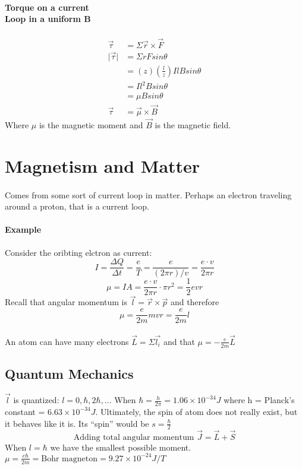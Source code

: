 \documentclass{article}
\begin{document}
    \paragraph{Torque on a current\\Loop in a uniform B}

    \begin{align*}
        \vec{\tau} &= \Sigma\vec{r}\times\vec{F}\\
        \lvert \vec{\tau}\rvert &= \Sigma rFsin\theta\\
        &= (z)(\frac{l}{z})I l B sin \theta \\
        &= I l^2Bsin\theta \\
        &= \mu B sin\theta \\
        \vec{\tau} &= \vec{\mu} \times \vec{B}
    \end{align*}
    Where $\mu$ is the magnetic moment and $\vec{B}$ is the magnetic field.
    \section{Magnetism and Matter}
    \paragraph{} Comes from some sort of current loop in matter. Perhaps an electron traveling around a proton, that is a current loop. 
    \paragraph{Example} Consider the oribting elctron as current:
    $$I = \frac{\Delta Q}{\Delta t} = \frac{e}{T} = \frac{e}{(2\pi r) / v} = \frac{e\cdot v}{2\pi r}$$
    $$\mu = IA = \frac{e\cdot v}{2\pi r} \cdot \pi r^2 = \frac{1}{2}evr$$
    Recall that angular momentum is $\vec{l} = \vec{r} \times \vec{p}$ and therefore 
    $$\mu = \frac{e}{2m}mvr = \frac{e}{2m}l$$
    \\An atom can have many electrons $\vec{L} = \Sigma \vec{l_i}$ and that $\mu = -\frac{e}{2m}\vec{L}$
    \subsection{Quantum Mechanics} $\vec{l}$ is quantized: $l = 0, \hbar, 2\hbar, ...$ 
    When $\hbar = \frac{h}{2\pi} = 1.06\times 10^{-34}J$ where h = Planck's constant = $6.63\times 10^{-34}J$. 
    Ultimately, the spin of atom does not really exist, but it behaves like it is. Its ``spin'' would be $s = \frac{\hbar}{2}$
    $$\text{Adding total angular momentum } \vec{J} = \vec{L} + \vec{S}$$
    When $l = \hbar$ we have the smallest possible moment. $\mu = \frac{e\hbar}{2m} = \text{Bohr magneton} = 9.27\times 10^{-24}J/T$
\end{document}
